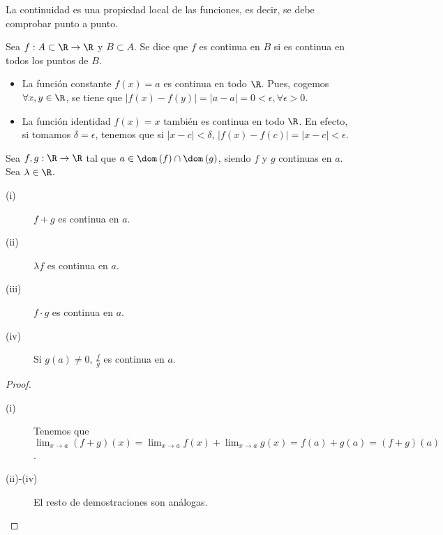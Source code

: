 La continuidad es una propiedad local de las funciones, es decir, se debe comprobar punto a punto.
\begin{fdefinition}[]
\normalfont Sea $\displaystyle f : A \subset \R \to \R $ y $\displaystyle B \subset A $. Se dice que $\displaystyle f $ es continua en $\displaystyle B $ si es continua en todos los puntos de $\displaystyle B $.
\end{fdefinition}
\begin{eg}
\normalfont 
\begin{itemize}
\item La función constante $\displaystyle f\left(x\right) = a $ es continua en todo $\displaystyle \R $. Pues, cogemos $\displaystyle \forall x,y \in \R $, se tiene que $\displaystyle \left|f\left(x\right)-f\left(y\right)\right| = \left|a - a\right| = 0 < \epsilon, \forall \epsilon > 0 $.
\item La función identidad $\displaystyle f\left(x\right) = x $ también es continua en todo $\displaystyle \R $. En efecto, si tomamos $\displaystyle \delta = \epsilon  $, tenemos que si $\displaystyle \left|x - c\right| < \delta  $, $\displaystyle \left|f\left(x\right)-f\left(c\right)\right| = \left|x - c\right| < \epsilon  $.
\end{itemize}
\end{eg}
\begin{fprop}[]
\normalfont Sea $\displaystyle f, g : \R \to \R $ tal que $\displaystyle a \in \dom\left(f\right) \cap \dom\left(g\right) $, siendo $\displaystyle f $ y $\displaystyle g $ continuas en $\displaystyle a $. Sea $\displaystyle \lambda \in \R $.
\begin{description}
\item[(i)] $\displaystyle f + g $ es continua en $\displaystyle a $.
\item[(ii)] $\displaystyle \lambda f $ es continua en $\displaystyle a $.
\item[(iii)] $\displaystyle f \cdot g $ es continua en $\displaystyle a $.
\item[(iv)] Si $\displaystyle g\left(a\right) \neq 0 $, $\displaystyle \frac{f}{g} $ es continua en $\displaystyle a $.
\end{description}
\end{fprop}
\begin{proof}
\begin{description}
\item[(i)] Tenemos que $\displaystyle \lim_{x \to a}\left(f + g\right)\left(x\right) = \lim_{x \to a}f\left(x\right) + \lim_{x \to a}g\left(x\right) = f\left(a\right) + g\left(a\right) = \left(f+g\right)\left(a\right) $.
\item[(ii)-(iv)] El resto de demostraciones son análogas.
\end{description}
\end{proof}
